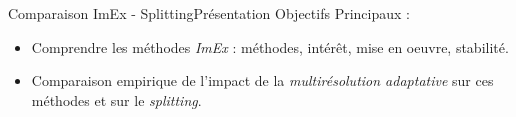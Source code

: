\begin{frame}{Comparaison ImEx - Splitting}{Présentation}
    Objectifs Principaux : \\
    \begin{itemize}
        \item Comprendre les méthodes \emph{ImEx} : méthodes, intérêt, mise en oeuvre, stabilité.
        \item Comparaison empirique de l'impact de la \emph{multirésolution adaptative} sur ces méthodes et sur le \emph{splitting}.
    \end{itemize}
\end{frame}